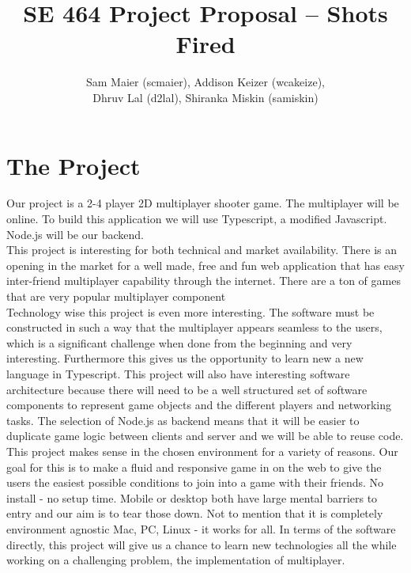 \documentclass[11pt, oneside]{article}   	%
\title{SE 464 Project Proposal -- Shots Fired}
\author{Sam Maier (scmaier), Addison Keizer (wcakeize), \\Dhruv Lal (d2lal), Shiranka Miskin (samiskin)}
\begin{document}
\maketitle
\section{The Project}
\hspace*{5mm} Our project is a 2-4 player 2D multiplayer shooter game. The multiplayer will be online. To build this application we will use Typescript, a modified Javascript. Node.js will be our backend. \\

This project is interesting for both technical and market availability. There is an opening in the market for a well made, free and fun web application that has easy inter-friend multiplayer capability through the internet. There are a ton of games that are very popular multiplayer component   \\

Technology wise this project is even more interesting. The software must be constructed in such a way that the multiplayer appears seamless to the users, which is a significant challenge when done from the beginning and very interesting. Furthermore this gives us the opportunity to learn new a new language in Typescript. This project will also have interesting software architecture because there will need to be a well structured set of software components to represent game objects and the different players and networking tasks. The selection of Node.js as backend means that it will be easier to duplicate game logic between clients and server and we will be able to reuse code. \\

This project makes sense in the chosen environment for a variety of reasons. Our goal for this is to make a fluid and responsive game in on the web to give the users the easiest possible conditions to join into a game with their friends. No install - no setup time. Mobile or desktop both have large mental barriers to entry and our aim is to tear those down. Not to mention that it is completely environment agnostic Mac, PC, Linux - it works for all. In terms of the software directly, this project will give us a chance to learn new technologies all the while working on a challenging problem, the implementation of multiplayer.
\end{document}
